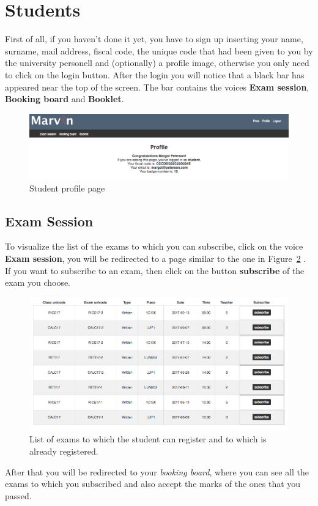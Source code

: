 \newpage
\section{Students}
First of all, if you haven't done it yet, you have to sign up inserting your name, surname, mail address, fiscal code, the unique code that had been given to you by the university personell and (optionally) a profile image, otherwise you only need to click on the login button.
After the login you will notice that a black bar has appeared near the top of the screen. The bar contains the voices \textbf{Exam session}, \textbf{Booking board} and \textbf{Booklet}.

\begin{figure}[H]
	\centering
	\includegraphics[width=1.0\textwidth]{img/studentProfile.png}
	\caption{Student profile page }
	\label{fig:studentProfile}
\end{figure}

\subsection{Exam Session}
To visualize the list of the exams to which you can subscribe, click on the voice \textbf{Exam session}, you will be redirected to a page similar to the one in Figure~\ref{fig:studentExams} . If you want to subscribe to an exam, then click on the button \textbf{subscribe} of the exam you choose.
\begin{figure}[H]
\centering
\includegraphics[width=1.0\textwidth]{img/studentExams.png}
\caption{List of exams to which the student can register and to which is already registered.}
\label{fig:studentExams}
\end{figure}
After that you will be redirected to your \emph{booking board}, where you can see all the exams to which you subscribed and also accept the marks of the ones that you passed.

